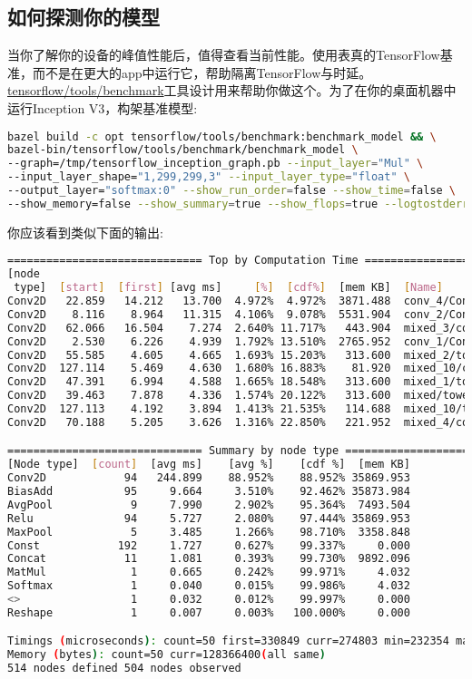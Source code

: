 \subsection{如何探测你的模型}
当你了解你的设备的峰值性能后，值得查看当前性能。使用表真的TensorFlow基准，而不是在更大的app中运行它，帮助隔离TensorFlow与时延。\href{https://www.github.com/tensorflow/tensorflow/blob/r1.4/tensorflow/tools/benchmark/}{tensorflow/tools/benchmark}工具设计用来帮助你做这个。为了在你的桌面机器中运行Inception V3，构架基准模型:
\begin{lstlisting}[language=Bash]
bazel build -c opt tensorflow/tools/benchmark:benchmark_model && \
bazel-bin/tensorflow/tools/benchmark/benchmark_model \
--graph=/tmp/tensorflow_inception_graph.pb --input_layer="Mul" \
--input_layer_shape="1,299,299,3" --input_layer_type="float" \
--output_layer="softmax:0" --show_run_order=false --show_time=false \
--show_memory=false --show_summary=true --show_flops=true --logtostderr 
\end{lstlisting}
你应该看到类似下面的输出:
\begin{lstlisting}[language=Bash]
============================== Top by Computation Time ==============================
[node
 type]  [start]  [first] [avg ms]     [%]  [cdf%]  [mem KB]  [Name]
Conv2D   22.859   14.212   13.700  4.972%  4.972%  3871.488  conv_4/Conv2D
Conv2D    8.116    8.964   11.315  4.106%  9.078%  5531.904  conv_2/Conv2D
Conv2D   62.066   16.504    7.274  2.640% 11.717%   443.904  mixed_3/conv/Conv2D
Conv2D    2.530    6.226    4.939  1.792% 13.510%  2765.952  conv_1/Conv2D
Conv2D   55.585    4.605    4.665  1.693% 15.203%   313.600  mixed_2/tower/conv_1/Conv2D
Conv2D  127.114    5.469    4.630  1.680% 16.883%    81.920  mixed_10/conv/Conv2D
Conv2D   47.391    6.994    4.588  1.665% 18.548%   313.600  mixed_1/tower/conv_1/Conv2D
Conv2D   39.463    7.878    4.336  1.574% 20.122%   313.600  mixed/tower/conv_1/Conv2D
Conv2D  127.113    4.192    3.894  1.413% 21.535%   114.688  mixed_10/tower_1/conv/Conv2D
Conv2D   70.188    5.205    3.626  1.316% 22.850%   221.952  mixed_4/conv/Conv2D

============================== Summary by node type ==============================
[Node type]  [count]  [avg ms]    [avg %]    [cdf %]  [mem KB]
Conv2D            94   244.899    88.952%    88.952% 35869.953
BiasAdd           95     9.664     3.510%    92.462% 35873.984
AvgPool            9     7.990     2.902%    95.364%  7493.504
Relu              94     5.727     2.080%    97.444% 35869.953
MaxPool            5     3.485     1.266%    98.710%  3358.848
Const            192     1.727     0.627%    99.337%     0.000
Concat            11     1.081     0.393%    99.730%  9892.096
MatMul             1     0.665     0.242%    99.971%     4.032
Softmax            1     0.040     0.015%    99.986%     4.032
<>                 1     0.032     0.012%    99.997%     0.000
Reshape            1     0.007     0.003%   100.000%     0.000

Timings (microseconds): count=50 first=330849 curr=274803 min=232354 max=415352 avg=275563 std=44193
Memory (bytes): count=50 curr=128366400(all same)
514 nodes defined 504 nodes observed
\end{lstlisting}
